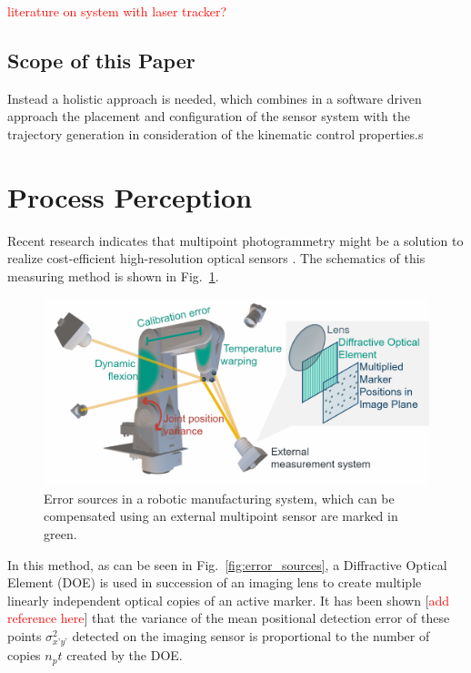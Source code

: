 \documentclass[5p,times,procedia]{elsarticle}
\begin{document}
\textcolor{red}{literature on system with laser tracker? }%

\subsection{Scope of this Paper}
%
Instead a holistic approach is needed, which combines in a software driven approach the placement and configuration of the sensor system with the trajectory generation in consideration of the kinematic control properties.s
%
%
%
%
\section{Process Perception}
%
Recent research indicates that multipoint photogrammetry might be a solution to realize cost-efficient high-resolution optical sensors \cite{Hartlieb_2021}.
The schematics of this measuring method is shown in Fig.~\ref{fig:MeasSys_Errors}.
\begin{figure}[h]
	\centering
	\includegraphics[width=0.9\columnwidth]{graphics/error_sources.png}
	\caption{Error sources in a robotic manufacturing system, which can be compensated using an external multipoint  sensor are marked in green.}
	\label{fig:MeasSys_Errors}
\end{figure}
In this method, as can be seen in Fig.~\ref{fig:error_sources}, a Diffractive Optical Element (DOE) is used in succession of an imaging lens to create multiple linearly independent optical copies of an active marker.
It has been shown [\textcolor{red}{add reference here}] that the variance of the mean positional detection error of these points $\sigma_{x’y’}^2$ detected on the imaging sensor is proportional to the number of copies $n_pt$ created by the DOE.\\
\end{document}
